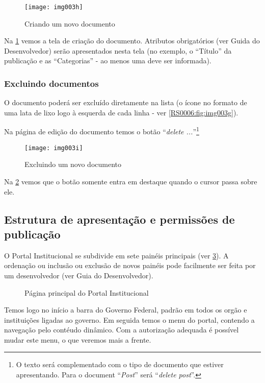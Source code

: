 \begin{figure}[!ht]
    \centering
    \texttt{[image: img003h]}
    \caption{Criando um novo documento}\label{RS0006:fig:img003h}
\end{figure}

Na \cref{RS0006:fig:img003h} vemos a tela de criação do documento. Atributos obrigatórios (ver Guida do Desenvolvedor) serão apresentados nesta tela (no exemplo, o ``Título'' da publicação e as ``Categorias'' - ao menos uma deve ser informada).

\subsubsection{Excluindo documentos}

O documento poderá ser excluído diretamente na lista (o ícone no formato de uma lata de lixo logo à esquerda de cada linha - ver \cref{RS0006:fig:img003g}).

Na página de edição do documento temos o botão ``\textit{delete ...}''\footnote{O texto será complementado com o tipo de documento que estiver apresentando. Para o document ``\textit{Post}'' será ``\textit{delete post}''.}

\begin{figure}[!ht]
    \centering
    \texttt{[image: img003i]}
    \caption{Excluindo um novo documento}\label{RS0006:fig:img003i}
\end{figure}

Na \cref{RS0006:fig:img003i} vemos que o botão somente entra em destaque quando o cursor passa sobre ele.

\subsection{Estrutura de apresentação e permissões de publicação}

O Portal Institucional se subdivide em sete painéis principais (ver \cref{RS0006:fig:portal}). A ordenação ou inclusão ou exclusão de novos painéis pode facilmente ser feita por um desenvolvedor (ver Guia do Desenvolvedor).

\begin{figure}[!ht]
    \centering
    \caption{Página principal do Portal Institucional}\label{RS0006:fig:portal}
\end{figure}

Temos logo no início a barra do Governo Federal, padrão em todos os orgão e instituições ligadas ao governo. Em seguida temos o menu do portal, contendo a navegação pelo contéudo dinâmico. Com a autorização adequada é possível mudar este menu, o que veremos mais a frente.

